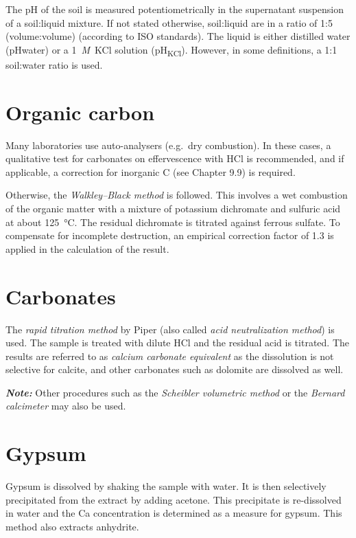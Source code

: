 \documentclass[
  letterpaper,
  DIV=11,
  numbers=noendperiod]{scrreprt}
\begin{document}
The pH of the soil is measured potentiometrically in the supernatant
suspension of a soil:liquid mixture. If not stated otherwise,
soil:liquid are in a ratio of 1:5 (volume:volume) (according to ISO
standards). The liquid is either distilled water (pHwater) or a
1~\emph{M}~KCl solution (pH\textsubscript{KCl}). However, in some
definitions, a 1:1 soil:water ratio is used.

\hypertarget{organic-carbon}{%
\section{Organic carbon}\label{organic-carbon}}

Many laboratories use auto-analysers (e.g.~dry combustion). In these
cases, a qualitative test for carbonates on effervescence with HCl is
recommended, and if applicable, a correction for inorganic C (see
Chapter 9.9) is required.

Otherwise, the \emph{Walkley--Black method} is followed. This involves a
wet combustion of the organic matter with a mixture of potassium
dichromate and sulfuric acid at about 125~°C. The residual dichromate is
titrated against ferrous sulfate. To compensate for incomplete
destruction, an empirical correction factor of 1.3 is applied in the
calculation of the result.

\hypertarget{carbonates}{%
\section{Carbonates}\label{carbonates}}

The \emph{rapid titration method} by Piper (also called \emph{acid
neutralization method}) is used. The sample is treated with dilute HCl
and the residual acid is titrated. The results are referred to as
\emph{calcium carbonate equivalent} as the dissolution is not selective
for calcite, and other carbonates such as dolomite are dissolved as
well.

\textbf{\emph{Note:}} Other procedures such as the \emph{Scheibler
volumetric method} or the \emph{Bernard calcimeter} may also be used.

\hypertarget{gypsum}{%
\section{Gypsum}\label{gypsum}}

Gypsum is dissolved by shaking the sample with water. It is then
selectively precipitated from the extract by adding acetone. This
precipitate is re-dissolved in water and the Ca concentration is
determined as a measure for gypsum. This method also extracts anhydrite.
\end{document}
